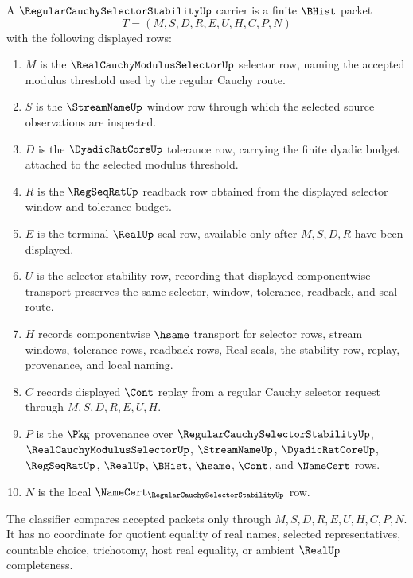 \begin{definition}
\label{def:regular-cauchy-selector-stability-carrier}
A $\RegularCauchySelectorStabilityUp$ carrier is a finite $\BHist$ packet
$$
T=(M,S,D,R,E,U,H,C,P,N)
$$
with the following displayed rows:
\begin{enumerate}
\item $M$ is the $\RealCauchyModulusSelectorUp$ selector row, naming the accepted modulus threshold used by the regular Cauchy route.
\item $S$ is the $\StreamNameUp$ window row through which the selected source observations are inspected.
\item $D$ is the $\DyadicRatCoreUp$ tolerance row, carrying the finite dyadic budget attached to the selected modulus threshold.
\item $R$ is the $\RegSeqRatUp$ readback row obtained from the displayed selector window and tolerance budget.
\item $E$ is the terminal $\RealUp$ seal row, available only after $M,S,D,R$ have been displayed.
\item $U$ is the selector-stability row, recording that displayed componentwise transport preserves the same selector, window, tolerance, readback, and seal route.
\item $H$ records componentwise $\hsame$ transport for selector rows, stream windows, tolerance rows, readback rows, Real seals, the stability row, replay, provenance, and local naming.
\item $C$ records displayed $\Cont$ replay from a regular Cauchy selector request through $M,S,D,R,E,U,H$.
\item $P$ is the $\Pkg$ provenance over $\RegularCauchySelectorStabilityUp$, $\RealCauchyModulusSelectorUp$, $\StreamNameUp$, $\DyadicRatCoreUp$, $\RegSeqRatUp$, $\RealUp$, $\BHist$, $\hsame$, $\Cont$, and $\NameCert$ rows.
\item $N$ is the local $\NameCert_{\RegularCauchySelectorStabilityUp}$ row.
\end{enumerate}
The classifier compares accepted packets only through $M,S,D,R,E,U,H,C,P,N$. It has no coordinate for quotient equality of real names, selected representatives, countable choice, trichotomy, host real equality, or ambient $\RealUp$ completeness.
\end{definition}

